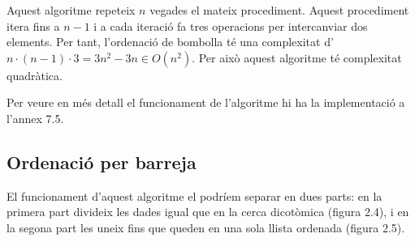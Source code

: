 Aquest algoritme repeteix $n$ vegades el mateix procediment. Aquest procediment itera fins a $n-1$ i a cada iteració fa tres operacions per intercanviar dos elements. Per tant, l'ordenació de bombolla té una complexitat d'$n \cdot (n-1) \cdot 3 = 3n^2 - 3n \in O(n^2)$. Per això aquest algoritme té complexitat quadràtica.

Per veure en més detall el funcionament de l'algoritme hi ha la implementació a l'annex 7.5.

\subsection{Ordenació per barreja} %
El funcionament d'aquest algoritme el podríem separar en dues parts: en la primera part divideix les dades igual que en la cerca dicotòmica (figura 2.4), i en la segona part les uneix fins que queden en una sola llista ordenada (figura 2.5).

